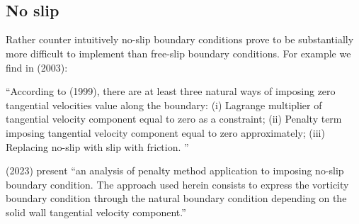 \begin{center}
\\
\textcite{haeb84} \hspace{4cm} \textcite{haeb88}
\end{center}

\begin{center}
\\
\textcite{laym97}
\end{center}

\subsection{No slip}

Rather counter intuitively no-slip boundary conditions prove to be substantially 
more difficult to implement than free-slip boundary conditions.
For example we find in \textcite{dedz03} (2003):
\begin{displayquote}
{\color{darkgray}
``According to \textcite{layt99} (1999), there are at least three natural ways of imposing zero tangential
velocities value along the boundary:
(i) Lagrange multiplier of tangential velocity component equal to zero as a constraint;
(ii) Penalty term imposing tangential velocity component equal to zero approximately;
(iii) Replacing no-slip with slip with friction.
''}
\end{displayquote}
\textcite{dedz03} (2023) present ``an analysis of penalty method application to imposing no-slip boundary
condition. The approach used herein consists to express the vorticity boundary condition through
the natural boundary condition depending on the solid wall tangential velocity component.''

